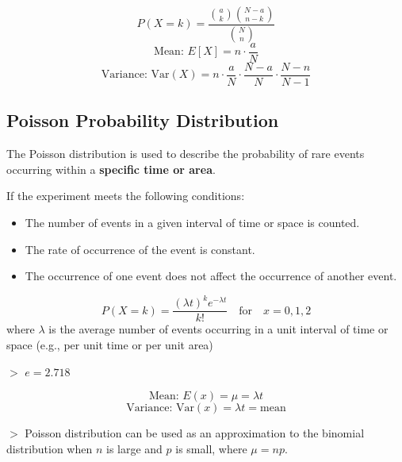 \documentclass[12pt,a4paper]{article}
\newcommand{\remark}[1]{
    {\small $>$ {\color{blue} #1}}
}
\begin{document}
\[P(X = k) = \frac{\binom{a}{k} \binom{N-a}{n-k}}{\binom{N}{n}}\]
\[\text{Mean: } E[X] = n \cdot \frac{a}{N}\]
\[\text{Variance: } \text{Var}(X) = n \cdot \frac{a}{N} \cdot \frac{N-a}{N} \cdot \frac{N-n}{N-1}\]

\subsection*{Poisson Probability Distribution}

The Poisson distribution is used to describe the probability of rare events occurring within a \textbf{specific time or area}.

If the experiment meets the following conditions:

\begin{itemize}
    \item The number of events in a given interval of time or space is counted.
    \item The rate of occurrence of the event is constant.
    \item The occurrence of one event does not affect the occurrence of another event.
\end{itemize}

\[P(X = k) = \frac{(\lambda t)^k e^{-\lambda t}}{k!} \quad \text{for} \quad x = 0,1,2\]
where $\lambda$ is the average number of events occurring in a unit interval of time or space (e.g., per unit time or per unit area)

\remark{\(e = 2.718\)}

\[\text{Mean: } E(x) = \mu = \lambda t\]
\[\text{Variance: } \text{Var}(x) = \lambda t = \text{mean}\]

\remark{Poisson distribution can be used as an approximation to the binomial distribution when $n$ is large and $p$ is small, where $\mu = np$.}
\end{document}
